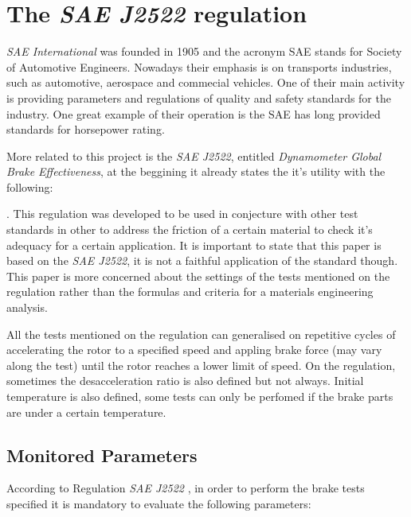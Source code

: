 \section{The \textit{SAE J2522} regulation}\label{the-sae-j2522-regulation}

		\textit{SAE International} was founded in 1905 and the acronym SAE stands for Society of Automotive Engineers. Nowadays their emphasis is on transports industries, such as automotive, aerospace and commecial vehicles. One of their main activity is providing parameters and regulations of quality and safety standards for the industry. One great example of their operation is the SAE has long provided standards for horsepower rating.
		\par
		More related to this project is the \textit{SAE J2522}, entitled \textit{Dynamometer Global Brake Effectiveness}, at the beggining it already states the it's utility with the following:


		\cite{saej2522}. This regulation was developed to be used in conjecture with other test standards in other to address the friction of a certain material to check it's adequacy for a certain application. It is important to state that this paper is based on the \textit{SAE J2522}, it is not a faithful application of the standard though. This paper is more concerned about the settings of the tests mentioned on the regulation rather than the formulas and criteria for a materials engineering analysis.
		\par
		All the tests mentioned on the regulation can generalised on repetitive cycles of accelerating the rotor to a specified speed and appling brake force (may vary along the test) until the rotor reaches a lower limit of speed. On the regulation, sometimes the desacceleration ratio is also defined but not always. Initial temperature is also defined, some tests can only be perfomed if the brake parts are under a certain temperature.

		\subsection{Monitored Parameters}
			According to Regulation \textit{SAE J2522} \cite{saej2522}, in order to perform the brake tests specified it is mandatory to evaluate the following parameters:


